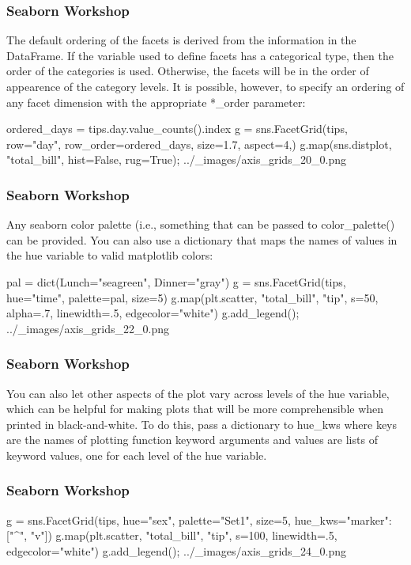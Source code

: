 \begin{frame}[fragile]
\frametitle{Seaborn Workshop}
\large
The default ordering of the facets is derived from the information in the DataFrame. If the variable used to define facets has a categorical type, then the order of the categories is used. Otherwise, the facets will be in the order of appearence of the category levels. It is possible, however, to specify an ordering of any facet dimension with the appropriate *_order parameter:

ordered_days = tips.day.value_counts().index
g = sns.FacetGrid(tips, row="day", row_order=ordered_days,
                  size=1.7, aspect=4,)
g.map(sns.distplot, "total_bill", hist=False, rug=True);
../_images/axis_grids_20_0.png

\end{frame}
\begin{frame}[fragile]
\frametitle{Seaborn Workshop}
\large
Any seaborn color palette (i.e., something that can be passed to color_palette() can be provided. You can also use a dictionary that maps the names of values in the hue variable to valid matplotlib colors:

pal = dict(Lunch="seagreen", Dinner="gray")
g = sns.FacetGrid(tips, hue="time", palette=pal, size=5)
g.map(plt.scatter, "total_bill", "tip", s=50, alpha=.7, linewidth=.5, edgecolor="white")
g.add_legend();
../_images/axis_grids_22_0.png

\end{frame}
\begin{frame}[fragile]
\frametitle{Seaborn Workshop}
\large

You can also let other aspects of the plot vary across levels of the hue variable, which can be helpful for making plots that will be more comprehensible when printed in black-and-white. To do this, pass a dictionary to hue_kws where keys are the names of plotting function keyword arguments and values are lists of keyword values, one for each level of the hue variable.
\end{frame}
\begin{frame}[fragile]
\frametitle{Seaborn Workshop}
\large
g = sns.FacetGrid(tips, hue="sex", palette="Set1", size=5, hue_kws={"marker": ["^", "v"]})
g.map(plt.scatter, "total_bill", "tip", s=100, linewidth=.5, edgecolor="white")
g.add_legend();
../_images/axis_grids_24_0.png
\end{frame}
